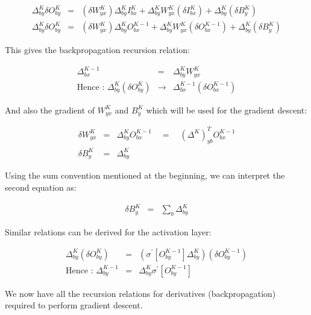 \begin{eqnarray*}
    \Delta_{by}^{K}\delta O_{by}^{K} & = & \left(\delta W_{yx}^{K}\right)\Delta_{by}^{K}I_{bx}^{K}+\Delta_{by}^{K}W_{yx}^{K}\left(\delta I_{bx}^{K}\right)+\Delta_{by}^{K}\left(\delta B_{y}^{K}\right)\\
    \Delta_{by}^{K}\delta O_{by}^{K} & = & \left(\delta W_{yx}^{K}\right)\Delta_{by}^{K}O_{bx}^{K-1}+\Delta_{by}^{K}W_{yx}^{K}\left(\delta O_{bx}^{K-1}\right)+\Delta_{by}^{K}\left(\delta B_{y}^{K}\right)
\end{eqnarray*}

This gives the backpropagation recursion relation:

\begin{eqnarray*}
    \Delta_{bx}^{K-1} & = & \Delta_{by}^{K}W_{yx}^{K}\\
    \text{Hence : }\Delta_{by}^{K}\left(\delta O_{by}^{K}\right) & \rightarrow & \Delta_{bx}^{K-1}\left(\delta O_{bx}^{K-1}\right)
\end{eqnarray*}

And also the gradient of $W_{yx}^{K}$ and $B_{y}^{K}$ which will
be used for the gradient descent:

\begin{eqnarray*}
    \delta W_{yx}^{K} & = & \Delta_{by}^{K}O_{bx}^{K-1}\quad=\quad\left(\Delta^{K}\right)_{yb}^{T}O_{bx}^{K-1}\\
    \delta B_{y}^{K} & = & \Delta_{by}^{K}
\end{eqnarray*}

Using the sum convention mentioned at the beginning, we can interpret
the second equation as:

\begin{eqnarray*}
    \delta B_{y}^{K} & = & \sum_{b}\Delta_{by}^{K}
\end{eqnarray*}

Similar relations can be derived for the activation layer:

\begin{eqnarray*}
    \Delta_{by}^{K}\left(\delta O_{by}^{K}\right) & = & \left(\sigma^{\prime}\left[O_{by}^{K-1}\right]\Delta_{by}^{K}\right)\left(\delta O_{by}^{K-1}\right)\\
    \text{Hence : }\Delta_{by}^{K-1} & = & \Delta_{by}^{K}\sigma^{\prime}\left[O_{by}^{K-1}\right]
\end{eqnarray*}

We now have all the recursion relations for derivatives (backpropagation)
required to perform gradient descent.